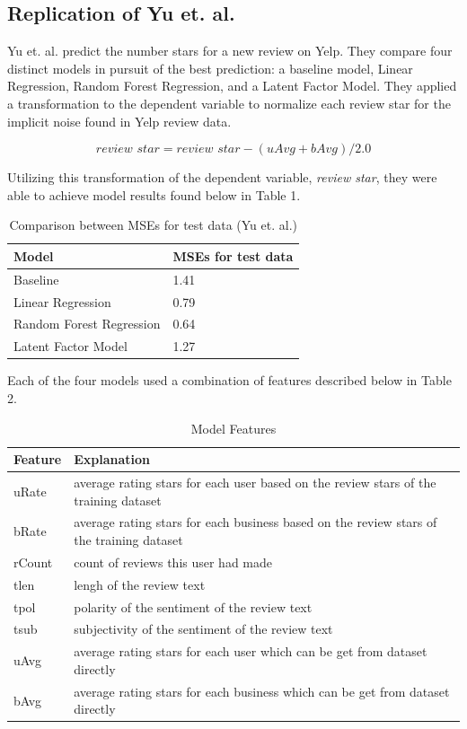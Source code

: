 \documentclass[12pt]{article}
\begin{document}
\subsection{Replication of Yu et. al.}

Yu et. al. \cite{yu2015restaurants} predict the number stars for a new review on Yelp.
They compare four distinct models in pursuit of the best prediction: a baseline model,
Linear Regression, Random Forest Regression, and a Latent Factor Model. They applied a
transformation to the dependent variable to normalize each review star for the implicit
noise found in Yelp review data.

\[
\textit{review star} = \textit{review star} - (uAvg + bAvg)/2.0
\]

Utilizing this transformation of the dependent variable, \textit{review star}, they were
able to achieve model results found below in Table 1.

\begin{table}[h]
  \caption{\label{tab:rep-models}Comparison between MSEs for test data (Yu et. al.)}
  \centering
  \begin{tabular}{|l|l|}
    \hline
    \textbf{Model} & \textbf{MSEs for test data} \\
    \hline
    Baseline & 1.41 \\
    \hline
    Linear Regression & 0.79 \\
    \hline
    Random Forest Regression & 0.64 \\
    \hline
    Latent Factor Model & 1.27 \\
    \hline
  \end{tabular}
\end{table}

Each of the four models used a combination of features described below in Table 2.

\begin{table}[h]
  \caption{\label{tab:features}Model Features}
  \centering
\begin{tabular}{| l | l |}
  \hline
  \textbf{Feature} & \textbf{Explanation} \\
  \hline
  uRate & average rating stars for each user based on the review stars of the
          training dataset \\
  \hline
  bRate & average rating stars for each business based on the review stars of the training 
          dataset \\
  \hline
  rCount & count of reviews this user had made \\
  \hline
  tlen & lengh of the review text \\
  \hline
  tpol & polarity of the sentiment of the review text \\
  \hline
  tsub & subjectivity of the sentiment of the review text \\
  \hline
  uAvg & average rating stars for each user which can be get from dataset directly \\
  \hline
  bAvg & average rating stars for each business which can be get from dataset directly \\
  \hline
\end{tabular}
\end{table}
\end{document}
